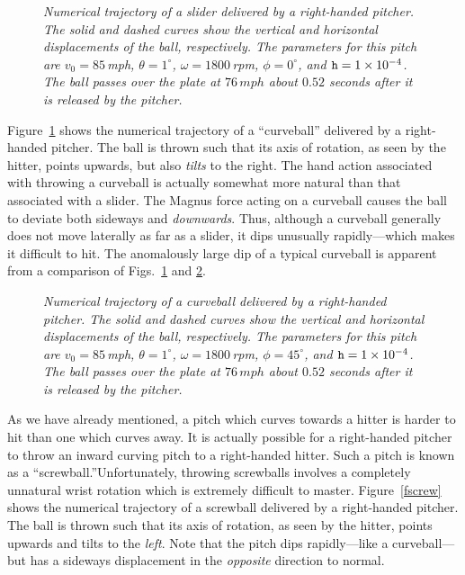 \begin{figure}
\epsfysize=3.5in
\centerline{}
\caption{\em Numerical trajectory of a slider delivered by a
right-handed pitcher. The solid and dashed curves show the vertical
and horizontal displacements of the ball, respectively. The
parameters for this pitch are $v_0=85$\,mph, $\theta = 1^\circ$, $\omega
=1800$\,rpm, $\phi = 0^\circ$, and ${\tt h}=1\times 10^{-4}$. 
The ball passes over the plate at $76\,mph$ about $0.52$ seconds after
it is released by the pitcher.}\label{fslider}
\end{figure}

Figure~\ref{fslider} shows the numerical trajectory of a ``curveball'' delivered
by a right-handed pitcher. The ball is thrown such that its
axis of rotation, as seen by the hitter,
 points upwards, but also {\em tilts}\/ to the right. The hand action
associated with throwing  a curveball is actually somewhat more natural than that associated
with  a slider. The Magnus force acting on a curveball
causes the ball to deviate both sideways and {\em downwards}. Thus, although a curveball
generally does not move laterally  as far as a slider, it dips unusually rapidly---which
makes it difficult to hit. The anomalously large dip of a typical curveball is apparent from
a comparison of Figs.~\ref{fslider} and \ref{fcurve}.

\begin{figure}
\epsfysize=3.5in
\centerline{}
\caption{\em Numerical trajectory of a curveball delivered by a
right-handed pitcher. The solid and dashed curves show the vertical
and horizontal displacements of the ball, respectively. The
parameters for this pitch are $v_0=85$\,mph, $\theta = 1^\circ$, $\omega
=1800$\,rpm, $\phi = 45^\circ$, and ${\tt h}=1\times 10^{-4}$. 
The ball passes over the plate at $76\,mph$ about $0.52$ seconds after
it is released by the pitcher.}\label{fcurve}
\end{figure}

As we have already mentioned, a pitch which curves towards a hitter is harder to
hit than one which curves away. It is actually possible for a right-handed
pitcher to throw  an inward curving pitch to a right-handed hitter. Such a
pitch is known as a ``screwball.''\@ Unfortunately, throwing  screwballs involves
a completely unnatural wrist rotation which is extremely difficult to master.
Figure~\ref{fscrew} shows the  numerical trajectory of a screwball delivered
by a right-handed pitcher. The ball is thrown such that its
axis of rotation, as seen by the hitter,
 points upwards and tilts to the {\em left}. Note that the pitch dips
rapidly---like a curveball---but has a sideways displacement in the {\em opposite}\/
direction to normal.

